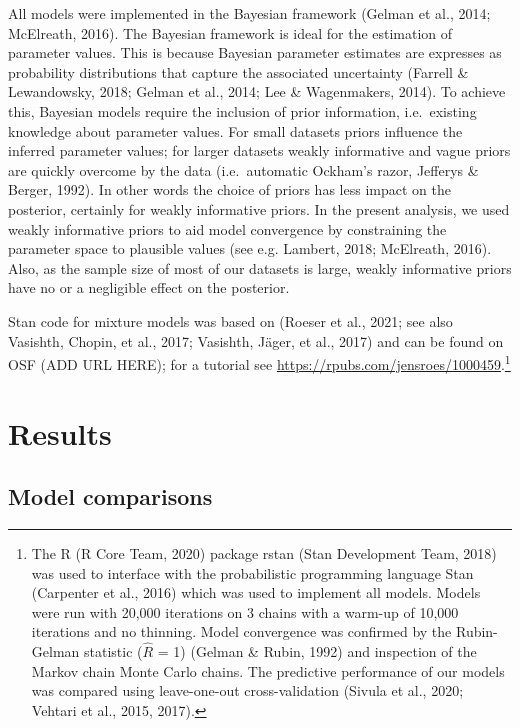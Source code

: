 \documentclass[
  man,floatsintext]{apa7}
\begin{document}
All models were implemented in the Bayesian framework (Gelman et al., 2014; McElreath, 2016). The Bayesian framework is ideal for the estimation of parameter values. This is because Bayesian parameter estimates are expresses as probability distributions that capture the associated uncertainty (Farrell \& Lewandowsky, 2018; Gelman et al., 2014; Lee \& Wagenmakers, 2014). To achieve this, Bayesian models require the inclusion of prior information, i.e.~existing knowledge about parameter values. For small datasets priors influence the inferred parameter values; for larger datasets weakly informative and vague priors are quickly overcome by the data (i.e.~automatic Ockham's razor, Jefferys \& Berger, 1992). In other words the choice of priors has less impact on the posterior, certainly for weakly informative priors. In the present analysis, we used weakly informative priors to aid model convergence by constraining the parameter space to plausible values (see e.g. Lambert, 2018; McElreath, 2016). Also, as the sample size of most of our datasets is large, weakly informative priors have no or a negligible effect on the posterior.

Stan code for mixture models was based on (Roeser et al., 2021; see also Vasishth, Chopin, et al., 2017; Vasishth, Jäger, et al., 2017) and can be found on OSF (ADD URL HERE); for a tutorial see \href{rpubs.com/jensroes/1000459}{https://rpubs.com/jensroes/1000459}.\footnote{The R (R Core Team, 2020) package rstan (Stan Development Team, 2018) was used to interface with the probabilistic programming language Stan (Carpenter et al., 2016) which was used to implement all models. Models were run with 20,000 iterations on 3 chains with a warm-up of 10,000 iterations and no thinning. Model convergence was confirmed by the Rubin-Gelman statistic (\(\hat{R}\) = 1) (Gelman \& Rubin, 1992) and inspection of the Markov chain Monte Carlo chains. The predictive performance of our models was compared using leave-one-out cross-validation (Sivula et al., 2020; Vehtari et al., 2015, 2017).}

\hypertarget{results}{%
\section{Results}\label{results}}

\hypertarget{model-comparisons}{%
\subsection{Model comparisons}\label{model-comparisons}}
\end{document}
